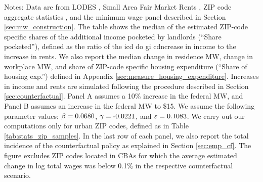 \begin{table}[hbt!]
    \begin{minipage}{.95\textwidth} \footnotesize
        \vspace{2mm}
        Notes: 
        Data are from LODES \parencite{CensusLODES}, 
        Small Area Fair Market Rents \parencite{hudSAFMR},
        ZIP code aggregate statistics \parencite{IRS}, and
        the minimum wage panel described in Section \ref{sec:mw_construction}.
        The table shows the median of the estimated ZIP-code specific shares of 
        the additional income pocketed by landlords (``Share pocketed''), 
        defined as the ratio of the icd do  gi  cdncrease in income to the increase in rents. 
        We also report the median change in residence MW, change in workplace MW,
        and share of ZIP-code specific housing expenditure 
        (``Share of housing exp.'') defined in Appendix 
        \ref{sec:measure_housing_expenditure}.
        Increases in income and rents are simulated following the procedure 
        described in Section \ref{sec:counterfactual}.
        Panel A assumes a 10\% increase in the federal MW, and
        Panel B assumes an increase in the federal MW to \$15.
        We assume the following parameter values:
        $\beta = \textnormal{0.0680}$, $\gamma = \textnormal{-0.0221}$, and $\varepsilon = \textnormal{0.1083}$.
        We carry out our computations only for urban ZIP codes, defined as 
        in Table \ref{tab:stats_zip_samples}.
        In the last row of each panel, we also report the total incidence of the 
        counterfactual policy as explained in Section \ref{sec:emp_cf}.
        The figure excludes ZIP codes located in CBAs for which the average
        estimated change in log total wages was below 0.1\% in the respective
        counterfactual scenario.
    \end{minipage}
\end{table}
